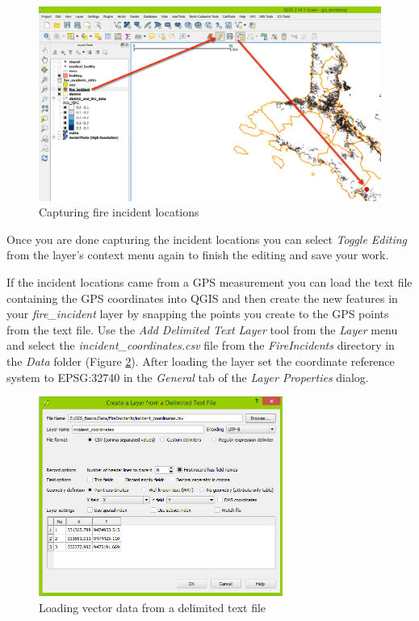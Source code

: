 \documentclass[a4paper,12pt,titlepage]{article}
\begin{document}
\begin{figure}[htb]
\centering
\includegraphics[width=12cm]{Images/create_features.png}
\caption{Capturing fire incident locations}\label{fig:create_features}
\end{figure}

Once you are done capturing the incident locations you can select \textit{Toggle Editing} from the layer's context menu again to finish the editing and save your work.

If the incident locations came from a GPS measurement you can load the text file containing the GPS coordinates into QGIS and then create the new features in your \textit{fire\_incident} layer by snapping the points you create to the GPS points from the text file. Use the \textit{Add Delimited Text Layer} tool from the \textit{Layer} menu and select the \textit{incident\_coordinates.csv} file from the \textit{FireIncidents} directory in the \textit{Data} folder (Figure \ref{fig:load_csv}). After loading the layer set the coordinate reference system to EPSG:32740 in the \textit{General} tab of the \textit{Layer Properties} dialog.

\begin{figure}[htb]
\centering
\includegraphics[width=8cm]{Images/load_csv.png}
\caption{Loading vector data from a delimited text file}\label{fig:load_csv}
\end{figure}
\end{document}
